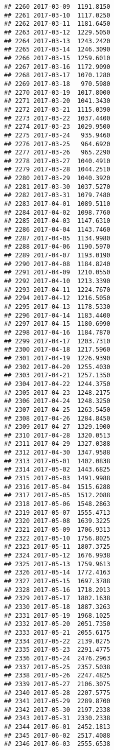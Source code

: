 \documentclass[
]{article}
\begin{document}
\begin{verbatim}
## 2260 2017-03-09  1191.8150
## 2261 2017-03-10  1117.0250
## 2262 2017-03-11  1181.6450
## 2263 2017-03-12  1229.5050
## 2264 2017-03-13  1243.2420
## 2265 2017-03-14  1246.3090
## 2266 2017-03-15  1259.6010
## 2267 2017-03-16  1172.9090
## 2268 2017-03-17  1070.1280
## 2269 2017-03-18   970.5980
## 2270 2017-03-19  1017.8000
## 2271 2017-03-20  1041.3430
## 2272 2017-03-21  1115.0390
## 2273 2017-03-22  1037.4400
## 2274 2017-03-23  1029.9500
## 2275 2017-03-24   935.9460
## 2276 2017-03-25   964.6920
## 2277 2017-03-26   965.2290
## 2278 2017-03-27  1040.4910
## 2279 2017-03-28  1044.2510
## 2280 2017-03-29  1040.3920
## 2281 2017-03-30  1037.5270
## 2282 2017-03-31  1079.7480
## 2283 2017-04-01  1089.5110
## 2284 2017-04-02  1098.7760
## 2285 2017-04-03  1147.6310
## 2286 2017-04-04  1143.7460
## 2287 2017-04-05  1134.9980
## 2288 2017-04-06  1190.5970
## 2289 2017-04-07  1193.0190
## 2290 2017-04-08  1184.8240
## 2291 2017-04-09  1210.0550
## 2292 2017-04-10  1213.3390
## 2293 2017-04-11  1224.7670
## 2294 2017-04-12  1216.5050
## 2295 2017-04-13  1178.5330
## 2296 2017-04-14  1183.4400
## 2297 2017-04-15  1180.6990
## 2298 2017-04-16  1184.7870
## 2299 2017-04-17  1203.7310
## 2300 2017-04-18  1217.5960
## 2301 2017-04-19  1226.9390
## 2302 2017-04-20  1255.4030
## 2303 2017-04-21  1257.1350
## 2304 2017-04-22  1244.3750
## 2305 2017-04-23  1248.2175
## 2306 2017-04-24  1248.3250
## 2307 2017-04-25  1263.5450
## 2308 2017-04-26  1284.8450
## 2309 2017-04-27  1329.1900
## 2310 2017-04-28  1320.0513
## 2311 2017-04-29  1327.0388
## 2312 2017-04-30  1347.9588
## 2313 2017-05-01  1402.0838
## 2314 2017-05-02  1443.6825
## 2315 2017-05-03  1491.9988
## 2316 2017-05-04  1515.6288
## 2317 2017-05-05  1512.2088
## 2318 2017-05-06  1548.2863
## 2319 2017-05-07  1555.4713
## 2320 2017-05-08  1639.3225
## 2321 2017-05-09  1706.9313
## 2322 2017-05-10  1756.8025
## 2323 2017-05-11  1807.3725
## 2324 2017-05-12  1676.9938
## 2325 2017-05-13  1759.9613
## 2326 2017-05-14  1772.4163
## 2327 2017-05-15  1697.3788
## 2328 2017-05-16  1718.2013
## 2329 2017-05-17  1802.1638
## 2330 2017-05-18  1887.3263
## 2331 2017-05-19  1968.1025
## 2332 2017-05-20  2051.7350
## 2333 2017-05-21  2055.6175
## 2334 2017-05-22  2139.0275
## 2335 2017-05-23  2291.4775
## 2336 2017-05-24  2476.2963
## 2337 2017-05-25  2357.5038
## 2338 2017-05-26  2247.4825
## 2339 2017-05-27  2106.3075
## 2340 2017-05-28  2207.5775
## 2341 2017-05-29  2289.8700
## 2342 2017-05-30  2197.2338
## 2343 2017-05-31  2330.2338
## 2344 2017-06-01  2452.1813
## 2345 2017-06-02  2517.4088
## 2346 2017-06-03  2555.6538

\end{verbatim}
\end{document}
